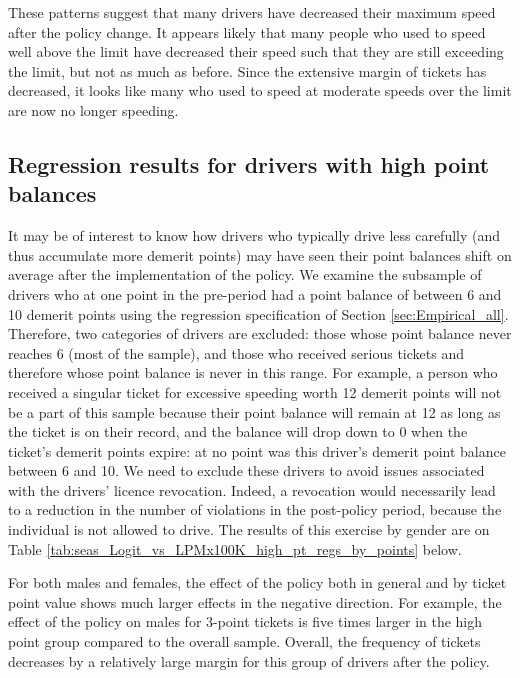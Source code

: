 These patterns suggest that many drivers have decreased their maximum speed 
after the policy change. 
It appears likely that many people who used to speed well above the limit 
have decreased their speed such that they are still exceeding the limit, 
but not as much as before. 
Since the extensive margin of tickets has decreased, 
it looks like many who used to speed at moderate speeds over the limit 
are now no longer speeding.


\subsection{Regression results for drivers with high point balances}
\label{sec:Empirical_high_pts}

It may be of interest to know how drivers who typically drive less carefully 
(and thus accumulate more demerit points) 
may have seen their point balances shift on average after the implementation of the policy. 
We examine the subsample of drivers who at one point in the pre-period 
had a point balance of between 6 and 10 demerit points 
using the regression specification of 
Section \ref{sec:Empirical_all}. 
Therefore, two categories of drivers are excluded: 
those whose point balance never reaches 6 (most of the sample), 
and those who received serious tickets and therefore whose point balance is never in this range. 
For example, a person who received a singular ticket for excessive speeding worth 12 demerit points 
will not be a part of this sample because their point balance will remain at 12 
as long as the ticket is on their record, 
and the balance will drop down to 0 when the ticket’s demerit points expire: 
at no point was this driver’s demerit point balance between 6 and 10. 
We need to exclude these drivers to avoid issues associated with the drivers’ licence revocation. 
Indeed, a revocation would necessarily lead to a reduction in the number of violations 
in the post-policy period, because the individual is not allowed to drive. 
The results of this exercise by gender are on 
Table \ref{tab:seas_Logit_vs_LPMx100K_high_pt_regs_by_points} below. 




For both males and females, 
the effect of the policy both in general and by ticket point value 
shows much larger effects in the negative direction. 
For example, the effect of the policy on males for 3-point tickets is five times larger 
in the high point group compared to the overall sample. 
Overall, the frequency of tickets decreases by a relatively large margin 
for this group of drivers after the policy.




